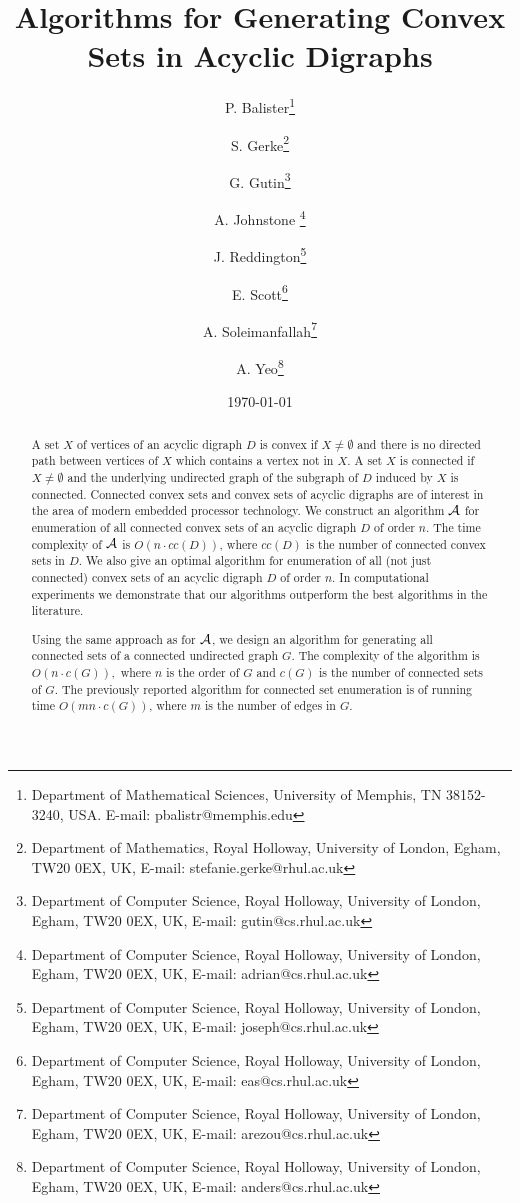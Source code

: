 \documentclass[11pt]{article}
\newcommand{\2}{\vspace{0.2 cm}}
\begin{document}
\date{\today}
\title{Algorithms for Generating Convex Sets in Acyclic Digraphs}
\author{P. Balister\thanks{Department of Mathematical Sciences,
University of Memphis, TN 38152-3240, USA. E-mail:
pbalistr@memphis.edu} \and S. Gerke\thanks{Department of Mathematics, Royal Holloway,
University of London, Egham, TW20 0EX, UK, E-mail:
stefanie.gerke@rhul.ac.uk} \and G. Gutin\thanks{Department of Computer Science, Royal Holloway,
University of London, Egham, TW20 0EX, UK, E-mail:
gutin@cs.rhul.ac.uk}\and A. Johnstone \thanks{Department of Computer Science, Royal Holloway,
University of London, Egham, TW20 0EX, UK, E-mail:
adrian@cs.rhul.ac.uk} \and J. Reddington\thanks{Department of Computer Science, Royal Holloway,
University of London, Egham, TW20 0EX, UK, E-mail:
joseph@cs.rhul.ac.uk} \and E. Scott\thanks{Department of Computer Science, Royal Holloway,
University of London, Egham, TW20 0EX, UK, E-mail:
eas@cs.rhul.ac.uk}\and A. Soleimanfallah\thanks{Department of Computer Science, Royal Holloway,
University of London, Egham, TW20 0EX, UK, E-mail:
arezou@cs.rhul.ac.uk} \and A. Yeo\thanks{Department of Computer Science, Royal Holloway,
University of London, Egham, TW20 0EX, UK, E-mail:
anders@cs.rhul.ac.uk}}

\maketitle

\begin{abstract}
A set $X$ of vertices of an acyclic digraph $D$ is convex if $X\neq
\emptyset$ and there is no directed path between vertices of $X$
which contains a vertex not in $X$. A set $X$ is connected if $X\neq
\emptyset$ and the underlying undirected graph of the subgraph of
$D$ induced by $X$ is connected. Connected convex sets and convex
sets of acyclic digraphs are of interest in the area of modern
embedded processor technology. We construct an algorithm $\cal A$
for enumeration of all connected convex sets of an acyclic digraph
$D$ of order $n$. The time complexity of $\cal A$ is $O(n\cdot
cc(D))$, where $cc(D)$ is the number of connected convex sets in
$D$. We also give an optimal algorithm for enumeration of all (not
just connected) convex sets of an acyclic digraph $D$ of order $n$.
In computational experiments we demonstrate that our algorithms
outperform the best algorithms in the literature.

Using the same approach as for $\cal A$, we design an algorithm for
generating all connected sets of a connected undirected graph $G$.
The complexity of the algorithm is $O(n\cdot c(G)),$ where $n$ is
the order of $G$ and $c(G)$ is the number of connected sets of $G.$
The previously reported algorithm for connected set enumeration is
of running time $O(mn\cdot c(G))$, where $m$ is the number of edges
in $G.$
\end{abstract}
\end{document}
